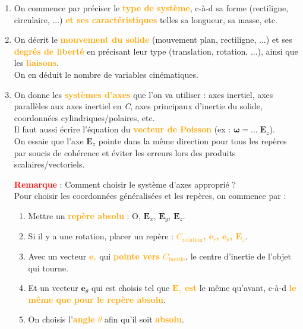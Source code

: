 \documentclass[a4paper]{article}
\begin{document}
\begin{enumerate}





\item On commence par préciser le \textcolor{orange}{\textbf{type de système}}, c-à-d sa forme (rectiligne, circulaire, ...) \textcolor{orange}{\textbf{et ses caractéristiques}} telles sa longueur, sa masse, etc.

\item On décrit le \textcolor{orange}{\textbf{mouvement du solide}} (mouvement plan, rectiligne, ...) et ses \textcolor{orange}{\textbf{degrés de liberté}} en précisant leur type (translation, rotation, ...), ainsi que les \textcolor{orange}{\textbf{liaisons}}. \\
On en déduit le nombre de variables cinématiques.

\item On donne les \textcolor{orange}{\textbf{systèmes d'axes}} que l'on va utiliser : axes inertiel, axes parallèles aux axes inertiel en \emph{C}, axes principaux d'inertie du solide, coordonnées cylindriques/polaires, etc. \\
Il faut aussi écrire l'équation du \textcolor{orange}{\textbf{vecteur de Poisson}} (ex : $ \boldsymbol{\omega} = ... \; \textbf{E}_z $). \\
On essaie que l'axe $ \textbf{E}_z $ pointe dans la même direction pour tous les repères par soucis de cohérence et éviter les erreurs lors des produits scalaires/vectoriels.

\textcolor{red}{\textbf{Remarque}} : Comment choisir le système d'axes approprié ? \\
Pour choisir les coordonnées généralisées et les repères, on commence par : 
\begin{enumerate}
    \item Mettre un \textcolor{orange}{\textbf{repère absolu}} : O, $ \textbf{E}_x $, $ \textbf{E}_y $, $ \textbf{E}_z $.
    \item Si il y a une rotation, placer un repère : \textcolor{orange}{\textbf{$ C_{\text{rotation}} $, $ \textbf{e}_r $, $ \textbf{e}_\theta $, $ \textbf{E}_z $}}.
    \item Avec un vecteur \textcolor{orange}{\textbf{$ \textbf{e}_r $}} qui \textcolor{orange}{\textbf{pointe vers $ C_{\text{inertie}} $}}, le centre d'inertie de l'objet qui tourne.
    \item Et un vecteur $ \textbf{e}_\theta $ qui est choisis tel que \textcolor{orange}{\textbf{$ \textbf{E}_z $ est}} le même qu'avant, c-à-d \textcolor{orange}{\textbf{le même que pour le repère absolu}}.
    \item On choisis l'\textcolor{orange}{\textbf{angle $ \theta $}} afin qu'il soit \textcolor{orange}{\textbf{absolu}}.
\end{enumerate}


\end{enumerate}
\end{document}
